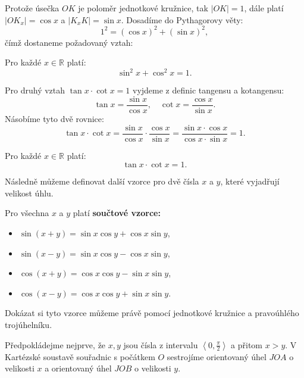 \documentclass[12pt,a4paper]{article}
\begin{document}
Protože úsečka $OK$ je poloměr jednotkové kružnice, tak $|OK| = 1$, dále platí $|OK_x| = \cos x$ a $|K_xK| = \sin x$.
Dosadíme do Pythagorovy věty:
\[1^2 = (\cos x)^2 + (\sin x)^2,\]
čímž dostaneme požadovaný vztah:
\begin{definitionbox}
    Pro každé $x \in \mathbb{R}$ platí:
    \[\sin^2 x + \cos^2 x = 1.\]
\end{definitionbox}


Pro druhý vztah $\tan x \cdot \cot x = 1$ vyjdeme z definic tangensu a kotangensu:
\[\tan x = \frac{\sin x}{\cos x}, \quad \cot x = \frac{\cos x}{\sin x}.\]
Násobíme tyto dvě rovnice:
\[
\tan x \cdot \cot x
= \frac{\sin x}{\cos x} \cdot \frac{\cos x}{\sin x}
= \frac{\sin x \cdot \cos x}{\cos x \cdot \sin x} = 1.
\]


\begin{definitionbox}
    Pro každé $x \in \mathbb{R}$ platí:
    \[\tan x \cdot \cot x = 1.\]   
\end{definitionbox}



Následně můžeme definovat další vzorce pro dvě čísla $x$ a $y$, které vyjadřují velikost úhlu.

\begin{definitionbox}
    Pro všechna $x$ a $y$ platí \textbf{součtové vzorce:}
    \begin{itemize}
        \item $\sin(x + y) = \sin x \cos y + \cos x \sin y$,
        \item $\sin(x - y) = \sin x \cos y - \cos x \sin y$,
        \item $\cos(x + y) = \cos x \cos y - \sin x \sin y$,
        \item $\cos(x - y) = \cos x \cos y + \sin x \sin y$.
    \end{itemize}
\end{definitionbox}

Dokázat si tyto vzorce můžeme právě pomocí jednotkové kružnice a pravoúhlého trojúhelníku.

Předpokládejme nejprve, že $x, y$ jsou čísla z intervalu $\left\langle 0, \frac{\pi}{2}\right\rangle$ 
a přitom $x > y$. V Kartézské soustavě souřadnic s počátkem $O$ sestrojíme orientovaný úhel
$JOA$ o velikosti $x$ a orientovaný úhel $JOB$ o velikosti $y$. 
\end{document}
